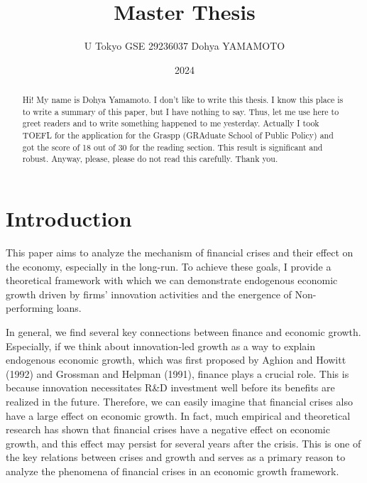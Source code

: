 \documentclass[a4paper,12pt]{article}
\title{Master Thesis}
\author{U Tokyo GSE 29236037 Dohya YAMAMOTO}
\date{2024}
\begin{document}
\maketitle

\begin{abstract}
    Hi! My name is Dohya Yamamoto. I don't like to write this thesis. I know this place is to write a summary of this paper, but I have nothing to say. Thus, let me use here to greet readers and to write something happened to me yesterday. Actually I took TOEFL for the application for the Graspp (GRAduate School of Public Policy) and got the score of 18 out of 30 for the reading section. This result is significant and robust. Anyway,  please, please do not read this carefully. Thank you.
\end{abstract}


\section{Introduction}
This paper aims to analyze the mechanism of financial crises and their effect on the economy, especially in the long-run. To achieve these goals, I provide a theoretical framework with which we can demonstrate endogenous economic growth driven by firms' innovation activities and the energence of Non-performing loans. \par
In general, we find several key connections between finance and economic growth. Especially, if we think about innovation-led growth as a way to explain endogenous economic growth, which was first proposed by Aghion and Howitt (1992) and Grossman and Helpman (1991), finance plays a crucial role. This is because innovation necessitates R\&D investment well before its benefits are realized in the future. Therefore, we can easily imagine that financial crises also have a large effect on economic growth. In fact, much empirical and theoretical research has shown that financial crises have a negative effect on economic growth, and this effect may persist for several years after the crisis. This is one of the key relations between crises and growth and serves as a primary reason to analyze the phenomena of financial crises in an economic growth framework. \par
\end{document}
